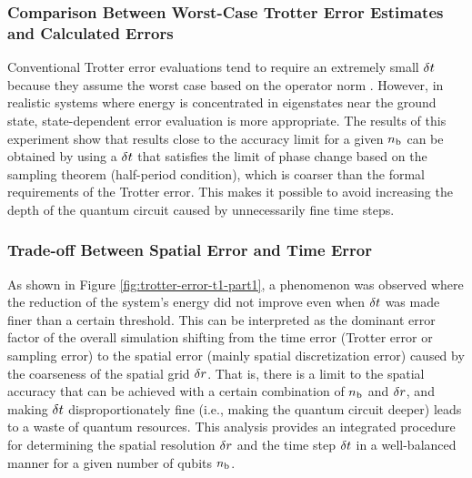 \documentclass[jctc-draft.tex]{subfiles}
\begin{document}
\subsubsection{Comparison Between Worst-Case Trotter Error Estimates and Calculated Errors}
Conventional Trotter error evaluations tend to require an extremely small
$\delta t$ because they assume the worst case based on the operator norm
\cite{Burgarth2024.PhysRevResearch.6.043155}. However, in realistic systems
where energy is concentrated in eigenstates near the ground state,
state-dependent error evaluation is more appropriate. The results of this
experiment show that results close to the accuracy limit for a given $n_{\mathrm{b}}$ can
be obtained by using a $\delta t$ that satisfies the limit of phase change based
on the sampling theorem (half-period condition), which is coarser than the
formal requirements of the Trotter error. This makes it possible to avoid
increasing the depth of the quantum circuit caused by unnecessarily fine time
steps.

\subsubsection{Trade-off Between Spatial Error and Time Error}
As shown in Figure \ref{fig:trotter-error-t1-part1}, a phenomenon was observed
where the reduction of the system's energy did not improve even when $\delta t$
was made finer than a certain threshold. This can be interpreted as the dominant
error factor of the overall simulation shifting from the time error (Trotter
error or sampling error) to the spatial error (mainly spatial discretization
error) caused by the coarseness of the spatial grid $\delta r$. That is, there is
a limit to the spatial accuracy that can be achieved with a certain combination
of $n_{\mathrm{b}}$ and $\delta r$, and making $\delta t$ disproportionately fine (i.e.,
making the quantum circuit deeper) leads to a waste of quantum resources. This
analysis provides an integrated procedure for determining the spatial resolution
$\delta r$ and the time step $\delta t$ in a well-balanced manner for a given
number of qubits $n_{\mathrm{b}}$.
\end{document}
